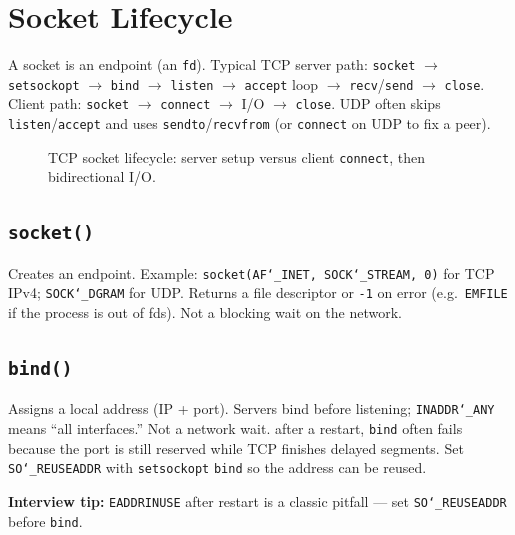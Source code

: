 \section{Socket Lifecycle}
\label{sec:socket-lifecycle}
A socket is an endpoint (an \texttt{fd}). Typical TCP server path: 
\texttt{socket} $\rightarrow$ \texttt{setsockopt} $\rightarrow$ \texttt{bind} $\rightarrow$ 
\texttt{listen} $\rightarrow$ \texttt{accept} loop $\rightarrow$ \texttt{recv}/\texttt{send} 
$\rightarrow$ \texttt{close}. 
Client path: \texttt{socket} $\rightarrow$ \texttt{connect} $\rightarrow$ I/O $\rightarrow$ \texttt{close}. 
UDP often skips \texttt{listen}/\texttt{accept} and uses \texttt{sendto}/\texttt{recvfrom} 
(or \texttt{connect} on UDP to fix a peer).

\begin{figure}[H]
    
    \caption{TCP socket lifecycle: server setup versus client \texttt{connect}, then bidirectional I/O.}
    \label{fig:socket-lifecycle}
\end{figure}

\subsection{\texttt{socket()}}
\label{subsec:socket}
Creates an endpoint. Example: \texttt{socket(AF\char`_INET, SOCK\char`_STREAM, 0)} for TCP IPv4; 
\texttt{SOCK\char`_DGRAM} for UDP. Returns a file descriptor or \texttt{-1} on error 
(e.g.\ \texttt{EMFILE} if the process is out of fds). Not a blocking wait on the network.

\subsection{\texttt{bind()}}
\label{subsec:bind}
Assigns a local address (IP + port). Servers bind before listening; 
\texttt{INADDR\char`_ANY} means ``all interfaces.'' Not a network wait.
\newline
{} after a restart, \texttt{bind} often fails 
because the port is still reserved while TCP finishes delayed segments. Set 
\texttt{SO\char`_REUSEADDR} with \texttt{setsockopt}  \texttt{bind} so the address 
can be reused.
\par\noindent\textbf{Interview tip:} \texttt{EADDRINUSE} after restart is a classic pitfall --- set 
\texttt{SO\char`_REUSEADDR} before \texttt{bind}.

